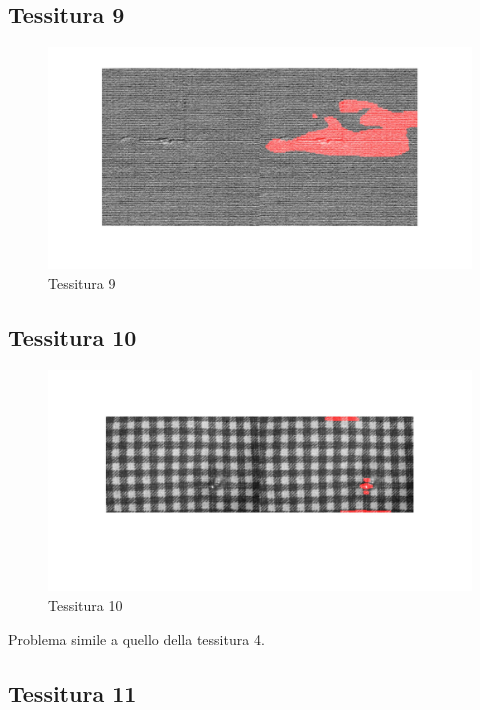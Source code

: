 \documentclass{article}
\begin{document}
\subsection{Tessitura 9}

\begin{figure}[h!]
	\centering
	\includegraphics[width=\textwidth]{results/res9.jpg}
	\caption{Tessitura 9}
\end{figure}

\newpage

\subsection{Tessitura 10}

\begin{figure}[h!]
	\centering
	\includegraphics[width=\textwidth]{results/res10.jpg}
	\caption{Tessitura 10}
\end{figure}

Problema simile a quello della tessitura 4.

\subsection{Tessitura 11}
\end{document}
